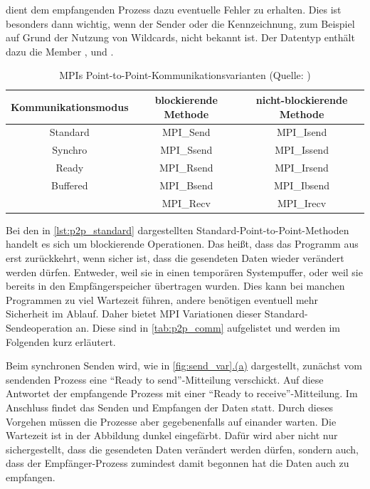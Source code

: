      dient dem empfangenden Prozess dazu eventuelle Fehler zu erhalten. Dies ist besonders dann wichtig, wenn der Sender oder die Kennzeichnung,
    zum Beispiel auf Grund der Nutzung von Wildcards, nicht bekannt ist. Der Datentyp  enthält dazu die Member ,  und .
    \citep{mpiv31}
    
    \begin{table}
      \begin{tabular}{|c|c|c|}
	\hline
	\textbf{Kommunikationsmodus}&\textbf{blockierende Methode}&\textbf{nicht-blockierende Methode}\\
	\hline
	Standard		    &MPI\_Send			  &MPI\_Isend			      \\
	\hline
	Synchro                     &MPI\_Ssend                   &MPI\_Issend                        \\
	\hline
	Ready                       &MPI\_Rsend                   &MPI\_Irsend                        \\
	\hline
	Buffered                    &MPI\_Bsend                   &MPI\_Ibsend                        \\
	\hline
	                            &MPI\_Recv                    &MPI\_Irecv                         \\
	\hline
      \end{tabular}
    \caption{MPIs Point-to-Point-Kommunikationsvarianten (Quelle: \citet{mpi_p2p})}
    \label{tab:p2p_comm}
    \end{table}
    
    Bei den in \autoref{lst:p2p_standard} dargestellten Standard-Point-to-Point-Methoden handelt es sich um blockierende Operationen. Das heißt, dass das Programm aus  
    erst zurückkehrt, wenn sicher ist, dass die gesendeten Daten wieder verändert werden dürfen. Entweder, weil sie in einen temporären Systempuffer, oder weil sie bereits in den 
    Empfängerspeicher übertragen wurden.
    Dies kann bei manchen Programmen zu viel Wartezeit führen, andere benötigen eventuell mehr Sicherheit im Ablauf. Daher bietet MPI Variationen dieser Standard-Sendeoperation an. 
    Diese sind in \autoref{tab:p2p_comm} aufgelistet und werden im Folgenden kurz erläutert.
    
    Beim synchronen Senden wird, wie in \autoref{fig:send_var}\hyperref[fig:sync_send]{.(a)} dargestellt, zunächst vom sendenden Prozess eine ``Ready to send''-Mitteilung verschickt. Auf 
    diese Antwortet der empfangende Prozess mit einer ``Ready to receive''-Mitteilung. Im Anschluss findet das Senden und Empfangen der Daten statt. Durch dieses Vorgehen müssen die Prozesse
    aber gegebenenfalls auf einander warten. Die Wartezeit ist in der Abbildung dunkel eingefärbt. Dafür wird aber nicht nur sichergestellt, dass die gesendeten Daten verändert werden dürfen,
    sondern auch, dass der Empfänger-Prozess zumindest damit begonnen hat die Daten auch zu empfangen. \citep{mpi_p2p, mpiv31}
    
